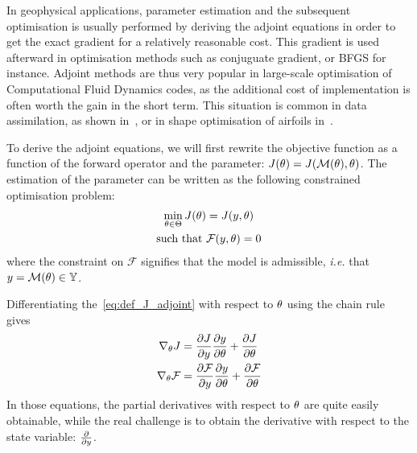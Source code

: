 \documentclass[../../Main_ManuscritThese.tex]{subfiles}
\begin{document}
In geophysical applications, parameter estimation and the subsequent
optimisation is usually performed by deriving the adjoint equations in
order to get the exact gradient for a relatively reasonable cost. This
gradient is used afterward in optimisation methods such as conjuguate
gradient, or BFGS for instance. Adjoint methods are thus very popular
in large-scale optimisation of Computational Fluid Dynamics codes, as
the additional cost of implementation is often worth the gain in the
short term. This situation is common in data assimilation, as shown
in~\cite{das_estimation_1991,das_variational_1992,honnorat_identification_2010,couderc_dassfow-shallow_2013},
or in shape optimisation of airfoils in~\cite{huyse_free-form_2001}.

To derive the adjoint equations, we will first rewrite the objective
function as a function of the forward operator and the parameter:
$J(\theta) = J(\mathcal{M}(\theta),\theta)$.  The estimation of the parameter
can be written as the following constrained optimisation problem:
\begin{equation}
  \begin{aligned}
  \min_{\kk \in \Kspace} J(\kk) &= J(y, \kk) \label{eq:def_J_adjoint} \\
  \text{such that } &\mathcal{F}(y, \kk) = 0 %
  \end{aligned}
\end{equation}
where the constraint on $\mathcal{F}$ signifies that the model is
admissible, \emph{i.e.} that $y = \mathcal{M}(\theta)\in \mathbb{Y}$.

 Differentiating the~\cref{eq:def_J_adjoint} with respect to $\theta$ using the chain rule gives
\begin{equation}
  \begin{aligned}
  \nabla_\theta J &= \frac{\partial J}{\partial y} \frac{\partial y}{\partial \theta} + \frac{\partial J}{\partial \theta}\\
    \nabla_\theta \mathcal{F} &= \frac{\partial \mathcal{F}}{\partial y} \frac{\partial y}{\partial \theta} + \frac{\partial \mathcal{F}}{\partial \theta}
  \end{aligned} \label{eq:aze}
\end{equation}
In those equations, the partial derivatives with respect to $\theta$ are
quite easily obtainable, while the real challenge is to obtain the
derivative with respect to the state variable: $\frac{\partial }{\partial y}$.
\end{document}
